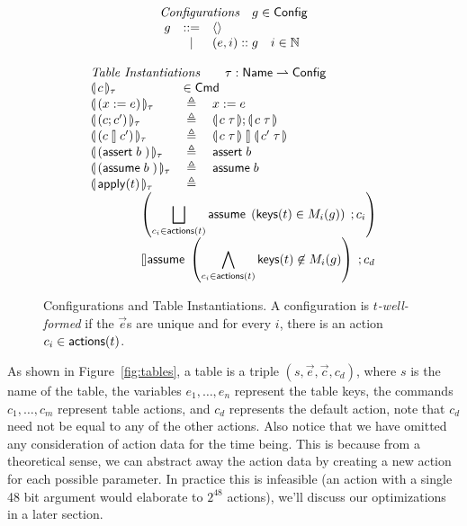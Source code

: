 \begin{figure}[ht]
  \[\begin{array}{l c l}
      \multicolumn{3}{c}{\textit{Configurations}\quad g \in \Config} \\
      \multicolumn 1 r g & ::= & \langle\rangle \\
        & \mid & (e,i)::g \quad i \in \mathbb N \\\\
      \multicolumn 3 l {\textit{Table Instantiations} \qquad \tau : \Name \rightharpoonup \mathsf{Config}}\\
      \parenbb{c}_\tau &\multicolumn 2 l {\in \mathsf{Cmd}} \\
      \parenbb{(x:= e)}_\tau &\triangleq& x := e \\
      \parenbb{(c;c')}_\tau &\triangleq& \parenbb{c\; \tau};\parenbb{c\; \tau} \\
      \parenbb{(c\angel c')}_\tau &\triangleq& \parenbb{c\; \tau} \angel \parenbb{c'\; \tau}\\
      \parenbb{(\assert b)}_\tau &\triangleq& \assert b \\
      \parenbb{(\assume b)}_\tau &\triangleq& \assume b \\
      \parenbb{\apply t}_\tau &\triangleq\\
      \multicolumn 3 l {\qquad\qquad \left( \displaystyle \Angel_{c_i \in \actions t}
      \assume{\left(\keys t \in M_i(g)\right)}; c_i\right)}\\
      \multicolumn 3 l {\qquad\qquad \displaystyle \angel \assume{\left(\bigwedge_{c_i \in \actions t} \keys t \not\in M_i(g)\right)}; c_d}
    \end{array}\]

  \caption{Configurations and Table Instantiations. A configuration is
    \emph{$t$-well-formed} if the $\vec e$s are unique and for every
    $i$, there is an action $c_i \in \mathsf{actions}(t)$.}
  \label{fig:configs}

  
  
\end{figure}



As shown in Figure~\ref{fig:tables}, a table is a triple
$(s, \vec e, \vec c, c_d)$, where $s$ is the name of the table, the
variables $e_1,\ldots,e_n$ represent the table keys, the commands
$c_1,\ldots, c_m$ represent table actions, and $c_d$ represents the
default action, note that $c_d$ need not be equal to any of the other
actions. Also notice that we have omitted any consideration of action
data for the time being. This is because from a theoretical sense, we
can abstract away the action data by creating a new action for each
possible parameter. In practice this is infeasible (an action with a
single 48 bit argument would elaborate to $2^{48}$ actions), we'll
discuss our optimizations in a later section.

